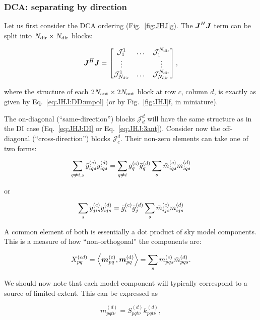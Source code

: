 \documentclass[useAMS,usenatbib]{mn2e}
\makeatletter
\newcommand{\mat}[1]{{\bmath{#1}}}
\newcommand{\JJ}{\mat{J}} %
\newcommand{\JHJ}{\JJ^H\JJ} %
\newcommand{\Matrix}[2]{\left [ \begin{array}{@{}#1@{}}#2\end{array} \right ]}
\makeatother
\begin{document}
\subsubsection{DCA: separating by direction}
\label{sec:dca}

Let us first consider the DCA ordering (Fig.~\ref{fig:JHJ}g). The $\JHJ$ term can be split into $N_\mathrm{dir}\times N_\mathrm{dir}$ blocks:

\newcommand{\JJJ}{\mathcal{J}}

\begin{equation}
\label{eq:JHJ:DD:blocked}
\JHJ = \Matrix{ccc}{\JJJ^1_1 & \dots & \JJJ^{\Nd}_1 \\
\vdots & & \vdots \\
\JJJ_{\Nd}^1 & \dots & \JJJ_{\Nd}^{\Nd} },
\end{equation}

where the structure of each $2N_\mathrm{ant}\times2N_\mathrm{ant}$ block at row $c$, column $d$, is exactly as 
given by Eq.~\ref{eq:JHJ:DD:unpol} (or by Fig.~\ref{fig:JHJ}f, in miniature). 


The on-diagonal (``same-direction'') blocks $\JJJ^d_d$ will have the same structure as in the DI 
case (Eq.~\ref{eq:JHJ:DI} or Eq.~\ref{eq:JHJ:3ant}). Consider now the off-diagonal (``cross-direction'') 
blocks $\JJJ^d_c$. Their non-zero elements can take one of two forms:

\[
  \sum\limits_{q\ne i,s} \bar{y}^{(c)}_{iqs} y^{(d)}_{iqs} = \sum\limits_{q\ne i} g^{(c)}_q \bar{g}^{(d)}_q \sum_s \bar{m}^{(c)}_{iqs} m^{(d)}_{iqs}
\]

or

\begin{equation}
  \sum\limits_{s} y^{(c)}_{jis} y^{(d)}_{ijs} = \bar{g}^{(c)}_i \bar{g}^{(d)}_j \sum_s \bar{m}^{(c)}_{ijs} m^{(d)}_{ijs}
\label{eq:JHJ:DD:crossterms}
\end{equation}

A common element of both is essentially a dot product of sky model components. This is a 
measure of how ``non-orthogonal'' the components are:

\begin{equation}
\label{eq:Xpqcd}
X_{pq}^{(cd)} = \left \langle \bmath{m}_{pq}^\mathrm{(c)},\bmath{m}^\mathrm{(d)}_{pq} \right \rangle = \sum_s \mmc_{pqs} \mmdH_{pqs}.
\end{equation}

We should now note that each model component will typically correspond to a source of limited extent. This can be 
expressed as

\[
m_{pqt\nu}^{(d)} = S^{(d)}_{pqt\nu} k^{(d)}_{pqt\nu}, 
\]
\end{document}
